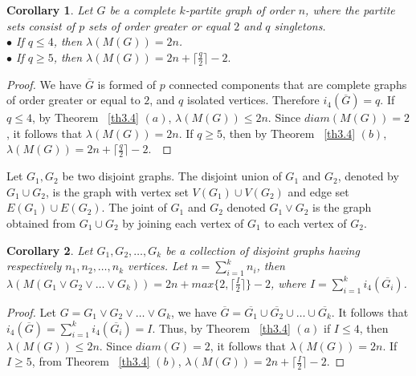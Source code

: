 \documentclass{article}
\newtheorem{cor} {Corollary}
\newtheorem{open problem} {Open Problem}
\numberwithin{lemma}{section}
\numberwithin{theorem}{section}
\numberwithin{cor}{section}
\numberwithin{prop}{section}
\numberwithin{con}{section}
\numberwithin{claim}{section}
\numberwithin{obs}{section}
\numberwithin{dnt}{section}
\begin{document}
\begin{cor}
	Let $G$ be a complete $k$-partite graph of order $n$, where the partite sets consist of $p$ sets of order greater or equal $2$  and $q$  singletons.\\
	$\bullet$ If $q\leq 4$, then $\lambda(M(G))=2n$.\\
	$\bullet$ If $q\geq 5$, then $\lambda(M(G))=2n+\lceil \frac{q}{2} \rceil -2.$
\end{cor}
\begin{proof}
	We have $\overline{G}$ is formed of $p$ connected components that are complete graphs of order greater or equal to $2$, and $q$ isolated vertices. Therefore $i_4(\overline{G})=q$. If $q\leq 4$, by Theorem ~\ref{th3.4} $(a)$,  $\lambda(M(G))\leq 2n$. Since $diam(M(G))=2$, it follows that $\lambda(M(G))=2n$. 
	If $q\geq 5$, then by Theorem ~\ref{th3.4} $(b)$, $\lambda(M(G))=2n+\lceil \frac{q}{2} \rceil -2$.~\end{proof}
Let $G_1,G_2$ be two disjoint graphs. The disjoint union of $G_1$ and $G_2$, denoted by $G_1\cup G_2$, is the graph with vertex set $V(G_1)\cup V(G_2)$ and edge set $E(G_1)\cup E(G_2)$. The joint of $G_1$ and $G_2$ denoted  $G_1\vee G_2$ is the graph obtained from $G_1\cup G_2$ by joining each vertex of $G_1$ to each vertex of $G_2$.
\begin{cor}
	Let $G_1,G_2,\ldots ,G_k$ be a collection of disjoint graphs having respectively $n_1,n_2,\ldots, n_k$ vertices. Let $n=\sum_{i=1}^{k} n_i$, then $\lambda(M(G_1\vee G_2\vee \ldots \vee G_k))=2n+max\{2,\lceil \frac{I}{2} \rceil \}-2$, where $I=\sum_{i=1}^{k}i_4(\overline{G_i})$.
\end{cor}
\begin{proof}
	Let $G=G_1\vee G_2\vee \ldots \vee G_k$, we have $\overline{G}=\overline{G_1}\cup\overline{G_2}\cup\ldots \cup \overline{G_k}$. It follows that $i_4(\overline{G})= \sum_{i=1}^{k}i_4(\overline{G_i})=I$. Thus, by Theorem ~\ref{th3.4} $(a)$ if $I\leq 4$, then $\lambda(M(G))\leq 2n$.  Since $diam(G)=2$, it follows that $\lambda(M(G))= 2n$. If $I\geq 5$, from Theorem ~\ref{th3.4} $(b)$, $\lambda(M(G))= 2n+ \lceil \frac{I}{2} \rceil -2 $.
\end{proof}
\end{document}
